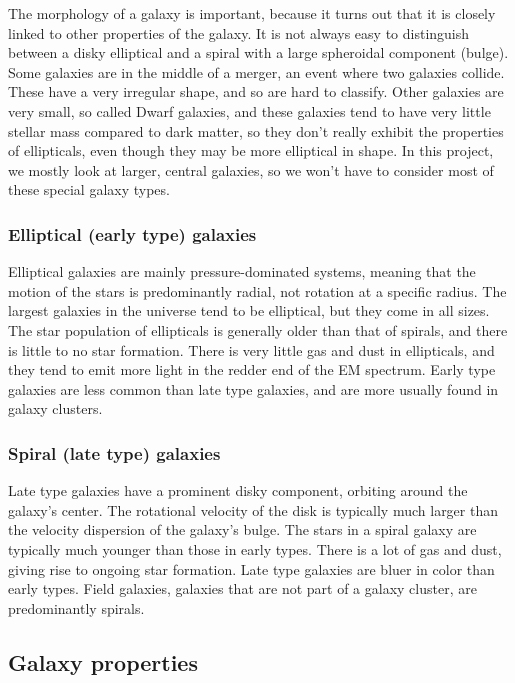 The morphology of a galaxy is important, because it turns out that it is closely linked to other properties of the galaxy. It is not always easy to distinguish between a disky elliptical and a spiral with a large spheroidal component (bulge). Some galaxies are in the middle of a merger, an event where two galaxies collide. These have a very irregular shape, and so are hard to classify. Other galaxies are very small, so called Dwarf galaxies, and these galaxies tend to have very little stellar mass compared to dark matter, so they don't really exhibit the properties of ellipticals, even though they may be more elliptical in shape. In this project, we mostly look at larger, central galaxies, so we won't have to consider most of these special galaxy types.

\subsubsection{Elliptical (early type) galaxies}
Elliptical galaxies are mainly pressure-dominated systems, meaning that the motion of the stars is predominantly radial, not rotation at a specific radius. The largest galaxies in the universe tend to be elliptical, but they come in all sizes. The star population of ellipticals is generally older than that of spirals, and there is little to no star formation. There is very little gas and dust in ellipticals, and they tend to emit more light in the redder end of the EM spectrum. Early type galaxies are less common than late type galaxies, and are more usually found in galaxy clusters.

\subsubsection{Spiral (late type) galaxies}
Late type galaxies have a prominent disky component, orbiting around the galaxy's center. The rotational velocity of the disk is typically much larger than the velocity dispersion of the galaxy's bulge. The stars in a spiral galaxy are typically much younger than those in early types. There is a lot of gas and dust, giving rise to ongoing star formation. Late type galaxies are bluer in color than early types. Field galaxies, galaxies that are not part of a galaxy cluster, are predominantly spirals. 

\subsection{Galaxy properties}


